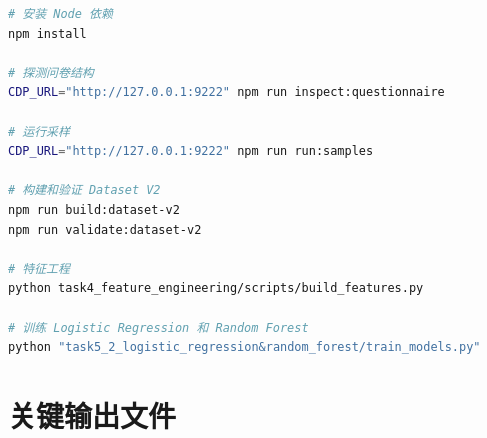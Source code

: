 \documentclass[UTF8]{ctexart}
\begin{document}
\begin{lstlisting}[language=bash, caption={项目主要复现命令}]
# 安装 Node 依赖
npm install

# 探测问卷结构
CDP_URL="http://127.0.0.1:9222" npm run inspect:questionnaire

# 运行采样
CDP_URL="http://127.0.0.1:9222" npm run run:samples

# 构建和验证 Dataset V2
npm run build:dataset-v2
npm run validate:dataset-v2

# 特征工程
python task4_feature_engineering/scripts/build_features.py

# 训练 Logistic Regression 和 Random Forest
python "task5_2_logistic_regression&random_forest/train_models.py"
\end{lstlisting}

\section{关键输出文件}
\end{document}
